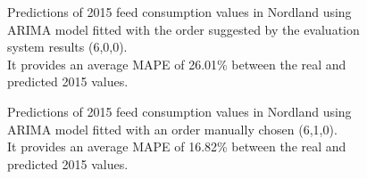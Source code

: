 \newpage

\begin{figure}[H]
    \caption[Predicted 2015 feed consumption in Nordland. Evaluation system ARIMA order.]{Predictions of 2015 feed consumption values in Nordland using ARIMA model fitted with the order suggested by the evaluation system results (6,0,0).\\  It provides an average MAPE of 26.01\% between the real and predicted 2015 values. }
    \label{fig: Nordland_ARIMAevaluation}
\end{figure}

\vspace{1cm}

\begin{figure}[H]
    \caption[Predicted 2015 feed consumption in Nordland. Manual ARIMA order.]{Predictions of 2015 feed consumption values in Nordland using ARIMA model fitted with an order manually chosen (6,1,0).\\  It provides an average MAPE of 16.82\% between the real and predicted 2015 values. }
    \label{fig: Nordland_ARIMAmanual}
\end{figure}


